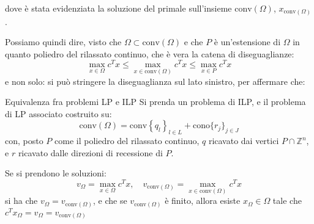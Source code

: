 \documentclass[a4paper,11pt]{article}
\begin{document}
\begin{center}


\end{center}

dove è stata evidenziata la soluzione del primale sull'insieme $\mathrm{conv}(\Omega)$, $x_{\mathrm{conv}(\Omega)}$.

Possiamo quindi dire, visto che $\Omega \subset \mathrm{conv}(\Omega)$ e che $P$ è un'estensione di $\Omega$ in quanto poliedro del rilassato continuo, che è vera la catena di diseguaglianze:
$$
\max_{x \in \Omega} c^T x \leq \max_{x \in \mathrm{conv}(\Omega)} c^T x \leq \max_{x \in P} c^T x
$$
e non solo: si può stringere la diseguaglianza sul lato sinistro, per affermare che:
\begin{theorem}{Equivalenza fra problemi LP e ILP}
	Si prenda un problema di ILP, e il problema di LP associato costruito su:
$$
\mathrm{conv}(\Omega) = \mathrm{conv} \left\{ q_l \right\}_{l \in L} + \mathrm{cono} \{ r_j \}_{j \in J}
$$
con, posto $P$ come il poliedro del rilassato continuo, $q$ ricavato dai vertici $P \cap \mathbb{Z}^n$, e $r$ ricavato dalle direzioni di recessione di $P$. 

Se si prendono le soluzioni:
$$ v_\Omega = \max_{x \in \Omega} c^T x, \quad v_{\mathrm{conv}(\Omega)} = \max_{x \in \mathrm{conv}(\Omega)} c^T x$$
si ha che $v_\Omega = v_{\mathrm{conv}(\Omega)}$, e che se $v_{\mathrm{conv}(\Omega)}$ è finito, allora esiste $x_\Omega \in \Omega$ tale che $c^T x_\Omega = v_\Omega = v_{\mathrm{conv}(\Omega)}$
\end{theorem}
\end{document}
